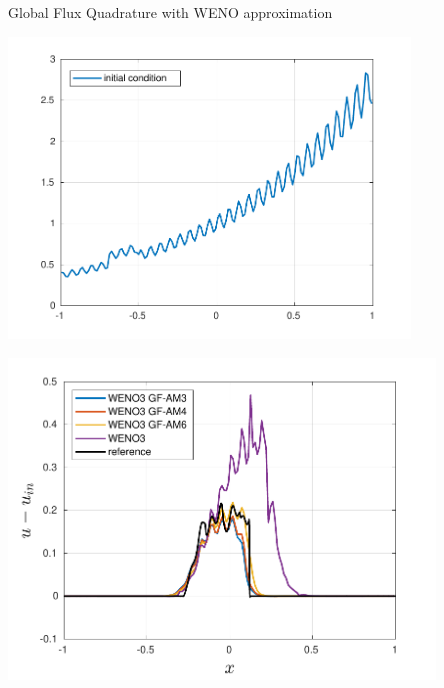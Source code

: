 \begin{frame}[t]{Global Flux Quadrature  with WENO approximation}
{\begin{minipage}{0.5\textwidth}
\centering\includegraphics[width=0.8\textwidth]{figs/WENO-FD/figures/Burgers/perturbations/initial_cond_DISC_n150} 
\end{minipage}\hfill
\begin{minipage}{0.5\textwidth}
\centering\includegraphics[width=0.85\textwidth]{figs/WENO-FD/figures/Burgers/perturbations/weno3_AM_DISC_n150} 
\end{minipage}
}

\end{frame}
